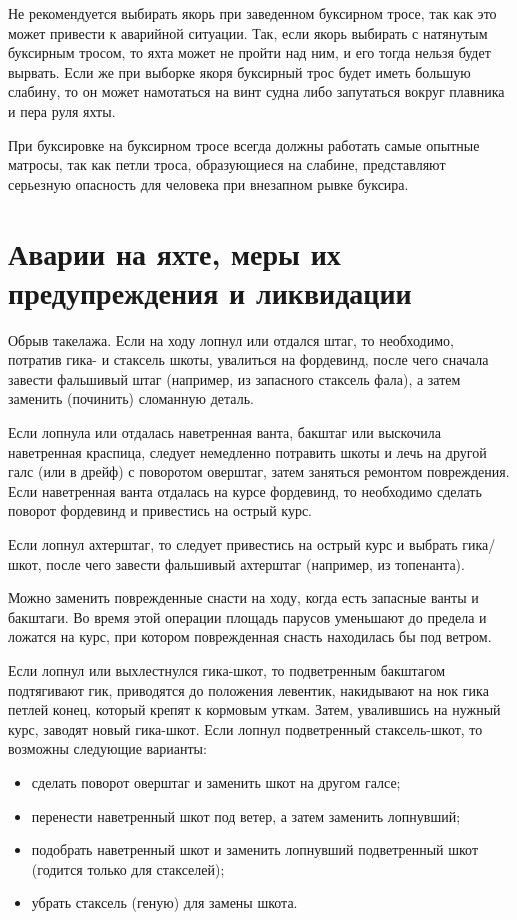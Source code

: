 Не рекомендуется выбирать якорь при заведенном буксирном тросе, так как это может привести к аварийной ситуации. Так, если якорь выбирать с натянутым буксирным тросом, то яхта может не пройти над ним, и его тогда нельзя будет вырвать. Если же при выборке якоря буксирный трос будет иметь большую слабину, то он может намотаться на винт судна либо запутаться вокруг плавника и пера руля яхты.

При буксировке на буксирном тросе всегда должны работать самые опытные матросы, так как петли троса, образующиеся на слабине, представляют серьезную опасность для человека при внезапном рывке буксира. 

\section{Аварии на яхте, меры их предупреждения и ликвидации}

Обрыв такелажа. Если на ходу лопнул или отдался штаг, то необходимо, потратив гика- и стаксель шкоты, увалиться на фордевинд, после чего сначала завести фальшивый штаг (например, из запасного стаксель фала), а затем заменить (починить) сломанную деталь.

Если лопнула или отдалась наветренная ванта, бакштаг или выскочила наветренная краспица, следует немедленно потравить шкоты и лечь на другой галс (или в дрейф) с поворотом оверштаг, затем заняться ремонтом повреждения. Если наветренная ванта отдалась на курсе фордевинд, то необходимо сделать поворот фордевинд и привестись на острый курс.

Если лопнул ахтерштаг, то следует привестись на острый курс и выбрать гика\-/шкот, после чего завести фальшивый ахтерштаг (например, из топенанта).

Можно заменить поврежденные снасти на ходу, когда есть запасные ванты и бакштаги. Во время этой операции площадь парусов уменьшают до предела и ложатся на курс, при котором поврежденная снасть находилась бы под ветром.

Если лопнул или выхлестнулся гика-шкот, то подветренным бакштагом подтягивают гик, приводятся до положения левентик, накидывают на нок гика петлей конец, который крепят к кормовым уткам. Затем, увалившись на нужный курс, заводят новый гика-шкот.
Если лопнул подветренный стаксель-шкот, то возможны следующие варианты: 
\begin{itemize}
\item сделать поворот оверштаг и заменить шкот на другом галсе; 
\item перенести наветренный шкот под ветер, а затем заменить лопнувший; 
\item подобрать наветренный шкот и заменить лопнувший подветренный шкот (годится только для стакселей); 
\item убрать стаксель (геную) для замены шкота. 
\end{itemize}

